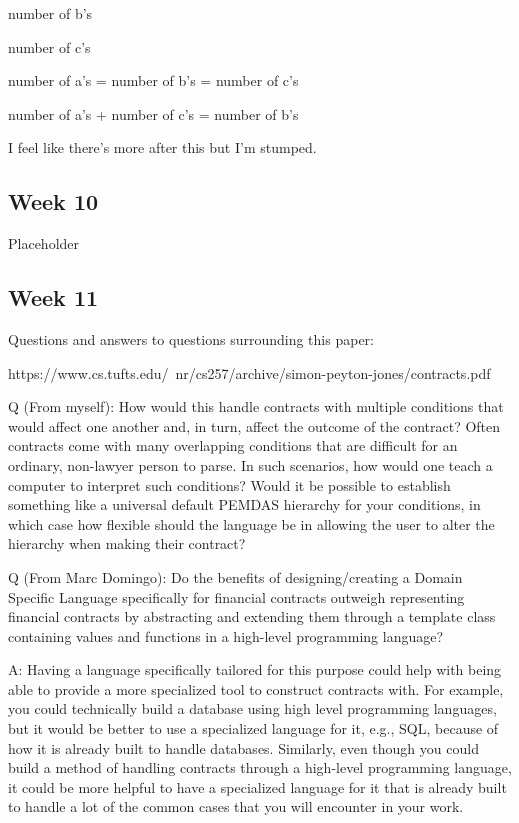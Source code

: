 \documentclass{article}
\theoremstyle{theorem}
\theoremstyle{definition}
\theoremstyle{remark}
\begin{document}
\medskip\noindent
number of b's

\medskip\noindent
number of c's

\medskip\noindent
number of a's = number of b's = number of c's

\medskip\noindent
number of a's + number of c's = number of b's

\medskip\noindent
I feel like there's more after this but I'm stumped.

\subsection{Week 10}
Placeholder

\subsection{Week 11}
Questions and answers to questions surrounding this paper:

\medskip\noindent
https://www.cs.tufts.edu/~nr/cs257/archive/simon-peyton-jones/contracts.pdf

\medskip\noindent
Q (From myself): How would this handle contracts with multiple conditions that would affect one another and, in turn, affect the outcome of the contract? Often contracts come with many overlapping conditions that are difficult for an ordinary, non-lawyer person to parse. In such scenarios, how would one teach a computer to interpret such conditions? Would it be possible to establish something like a universal  default PEMDAS hierarchy for your conditions, in which case how flexible should the language be in allowing the user to alter the hierarchy when making their contract?

\medskip\noindent
Q (From Marc Domingo): Do the benefits of designing/creating a Domain Specific Language specifically for financial contracts outweigh representing financial contracts by abstracting and extending them through a template class containing values and functions in a high-level programming language?

\medskip\noindent
A: Having a language specifically tailored for this purpose could help with being able to provide a more specialized tool to construct contracts with. For example, you could technically build a database using high level programming languages, but it would be better to use a specialized language for it, e.g., SQL, because of how it is already built to handle databases. Similarly, even though you could build a method of handling contracts through a high-level programming language, it could be more helpful to have a specialized language for it that is already built to handle a lot of the common cases that you will encounter in your work.
\end{document}
